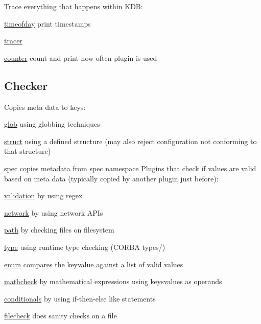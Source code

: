 Trace everything that happens within K\+D\+B\+:


\begin{DoxyItemize}
\item \hyperlink{md_src_plugins_timeofday_README_src_plugins_timeofday_README_md}{timeofday} print timestamps
\item \hyperlink{md_src_plugins_tracer_README_src_plugins_tracer_README_md}{tracer}
\item \hyperlink{md_src_plugins_counter_README_src_plugins_counter_README_md}{counter} count and print how often plugin is used
\end{DoxyItemize}

\subsection*{Checker}

Copies meta data to keys\+:


\begin{DoxyItemize}
\item \hyperlink{md_src_plugins_glob_README_src_plugins_glob_README_md}{glob} using globbing techniques
\item \hyperlink{md_src_plugins_struct_README_src_plugins_struct_README_md}{struct} using a defined structure (may also reject configuration not conforming to that structure)
\item \hyperlink{md_src_plugins_spec_README_src_plugins_spec_README_md}{spec} copies metadata from spec namespace Plugins that check if values are valid based on meta data (typically copied by another plugin just before)\+:
\item \hyperlink{md_src_plugins_validation_README_src_plugins_validation_README_md}{validation} by using regex
\item \hyperlink{md_src_plugins_network_README_src_plugins_network_README_md}{network} by using network A\+P\+Is
\item \hyperlink{md_src_plugins_path_README_src_plugins_path_README_md}{path} by checking files on filesystem
\item \hyperlink{md_src_plugins_type_README_src_plugins_type_README_md}{type} using runtime type checking (C\+O\+R\+B\+A types/)
\item \hyperlink{md_src_plugins_enum_README_src_plugins_enum_README_md}{enum} compares the keyvalue against a list of valid values
\item \hyperlink{md_src_plugins_mathcheck_README_src_plugins_mathcheck_README_md}{mathcheck} by mathematical expressions using keysvalues as operands
\item \hyperlink{md_src_plugins_conditionals_README_src_plugins_conditionals_README_md}{conditionals} by using if-\/then-\/else like statements
\item \hyperlink{md_src_plugins_filecheck_README_src_plugins_filecheck_README_md}{filecheck} does sanity checks on a file
\end{DoxyItemize}


